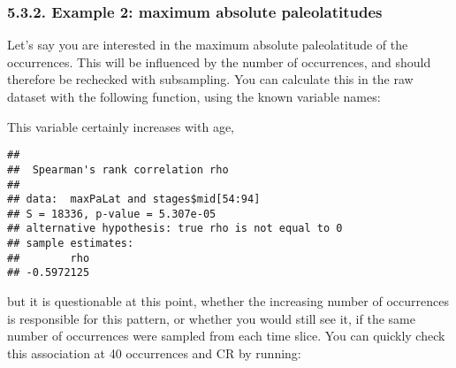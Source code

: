 \documentclass[]{article}
\newenvironment{Shaded}{\begin{snugshade}}{\end{snugshade}}
\newcommand{\ControlFlowTok}[1]{\textcolor[rgb]{0.13,0.29,0.53}{\textbf{#1}}}
\newcommand{\DataTypeTok}[1]{\textcolor[rgb]{0.13,0.29,0.53}{#1}}
\newcommand{\DecValTok}[1]{\textcolor[rgb]{0.00,0.00,0.81}{#1}}
\newcommand{\KeywordTok}[1]{\textcolor[rgb]{0.13,0.29,0.53}{\textbf{#1}}}
\newcommand{\NormalTok}[1]{#1}
\newcommand{\OperatorTok}[1]{\textcolor[rgb]{0.81,0.36,0.00}{\textbf{#1}}}
\newcommand{\StringTok}[1]{\textcolor[rgb]{0.31,0.60,0.02}{#1}}
\begin{document}
\hypertarget{example-2-maximum-absolute-paleolatitudes}{%
\subsubsection{5.3.2. Example 2: maximum absolute
paleolatitudes}\label{example-2-maximum-absolute-paleolatitudes}}

Let's say you are interested in the maximum absolute paleolatitude of
the occurrences. This will be influenced by the number of occurrences,
and should therefore be rechecked with subsampling. You can calculate
this in the raw dataset with the following function, using the known
variable names:

\begin{Shaded}
\end{Shaded}

This variable certainly increases with age,

\begin{Shaded}
\end{Shaded}

\begin{verbatim}
## 
##  Spearman's rank correlation rho
## 
## data:  maxPaLat and stages$mid[54:94]
## S = 18336, p-value = 5.307e-05
## alternative hypothesis: true rho is not equal to 0
## sample estimates:
##        rho 
## -0.5972125
\end{verbatim}

but it is questionable at this point, whether the increasing number of
occurrences is responsible for this pattern, or whether you would still
see it, if the same number of occurrences were sampled from each time
slice. You can quickly check this association at 40 occurrences and CR
by running:
\end{document}
